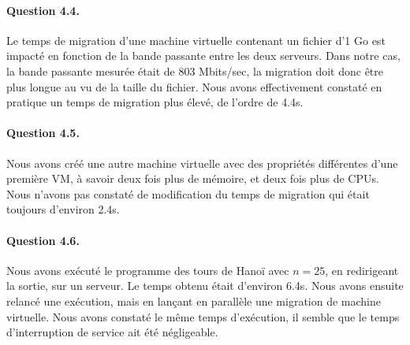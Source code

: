 \documentclass[a4paper]{article}
\begin{document}
\paragraph{Question 4.4.}
Le temps de migration d'une machine virtuelle contenant un fichier d'1 Go est impacté en fonction de la bande passante entre les deux serveurs.
Dans notre cas, la bande passante mesurée était de 803 Mbits/sec, la migration doit donc être plus longue au vu de la taille du fichier.
Nous avons effectivement constaté en pratique un temps de migration plus élevé, de l'ordre de 4.4s.

\paragraph{Question 4.5.}
Nous avons créé une autre machine virtuelle avec des propriétés différentes d'une première VM, à savoir deux fois plus de mémoire, et deux fois plus de CPUs.
Nous n'avons pas constaté de modification du temps de migration qui était toujours d'environ 2.4s.

\paragraph{Question 4.6.}
Nous avons exécuté le programme des tours de Hanoï avec \(n=25\), en redirigeant la sortie, sur un serveur.
Le temps obtenu était d'environ 6.4s.
Nous avons ensuite relancé une exécution, mais en lançant en parallèle une migration de machine virtuelle.
Nous avons constaté le même temps d'exécution, il semble que le temps d'interruption de service ait été négligeable.
\end{document}
